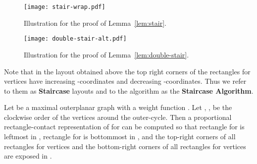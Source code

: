 \documentclass{llncs}
\newenvironment{sketch}{\medskip\noindent{\bf Proof Sketch:}}{\mbox{}\hfill\qed\par}
\begin{document}
\begin{figure}[tb]
\hfill
\begin{minipage}[b]{.4\textwidth}
	\centering
	\texttt{[image: stair-wrap.pdf]}
	\caption{Illustration for the proof of Lemma~\ref{lem:stair}.}
	\label{fig:stair}
\end{minipage}
\hfill
\begin{minipage}[b]{.4\textwidth}
	\centering
	\texttt{[image: double-stair-alt.pdf]}
	\caption{Illustration for the proof of Lemma~\ref{lem:double-stair}.}
\label{fig:double-stair}
\end{minipage}
\hfill
\end{figure}



 Note that in the layout obtained above
the top right corners of the rectangles for vertices 
 have increasing -coordinates and decreasing
 -coordinates. Thus we refer to them as \textbf{Staircase} layouts
 and to the algorithm as the \textbf{Staircase
 Algorithm}. 


\begin{lemma}
\label{lem:double-stair}
	Let  be a maximal outerplanar graph with a weight function . Let
	, ,  be the clockwise order of the vertices
        around the outer-cycle.
Then a proportional rectangle-contact representation   of 
for  can be computed so that rectangle  for  is
leftmost in , rectangle  for  is bottommost in
, and the top-right corners of all rectangles
	for vertices  and the bottom-right corners of all rectangles for vertices
	 are exposed in .
\end{lemma}
\begin{comment}
\begin{figure}[t]
\centering
	\texttt{[image: double-stair]}\\
	(a)\hspace{0.2\textwidth}(b)\hspace{0.22\textwidth}(c)
	\hspace{0.2\textwidth}(d)\hspace{0.05\textwidth}
	\caption{Illustration for the proof of Lemma~\ref{lem:double-stair}.}
\label{fig:double-stair}
\end{figure}

\begin{sketch}
Computing  is easy when  is a single edge , so let
  have at least 3 vertices and  be the unique vertex adjacent to . Define the two
 graphs  and  as in the proof of Lemma~\ref{lem:stair}; see Fig.~\ref{fig:double-stair}(a).
If , then recursively draw  and remove the rectangles for  and  from it;
 call the result . Draw  using the \textbf{Staircase Algorithm} and remove
  and  to find . Now draw three mutually touching rectangles , 
 and  for ,  and , with the necessary areas and place 
 (after possible scaling)  between ,  and  (after  clockwise
 rotation and possible scaling) between ,  to complete the drawing; see
 Fig.~\ref{fig:double-stair}(b). The cases when  and  follow similar constructions;
 see Fig.~\ref{fig:double-stair}(c)--(d).
\end{sketch}
\end{comment}
\end{document}
